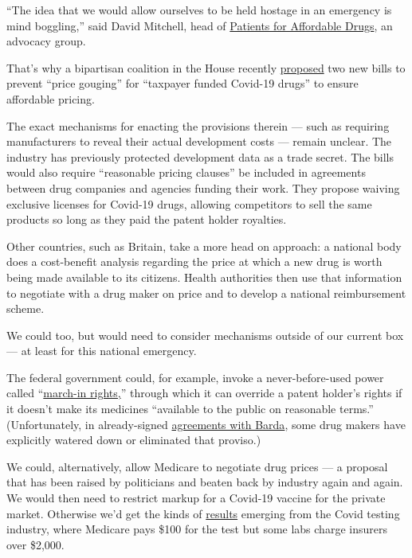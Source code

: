 ``The idea that we would allow ourselves to be held hostage in an
emergency is mind boggling,'' said David Mitchell, head of
\href{https://www.patientsforaffordabledrugsnow.org/press-releases-and-news-content/2020/6/22/patients-for-affordable-drugs-now-endorses-bipartisan-legislation-to-ensure-reasonable-prices-for-taxpayer-funded-covid-19-drugs}{Patients
for Affordable Drugs}, an advocacy group.

That's why a bipartisan coalition in the House recently
\href{https://www.healthleadersmedia.com/welcome-ad?toURL=/finance/bipartisan-bills-aim-prevent-price-gouging-taxpayer-funded-covid-19-drugs}{proposed}
two new bills to prevent ``price gouging'' for ``taxpayer funded
Covid-19 drugs'' to ensure affordable pricing.

The exact mechanisms for enacting the provisions therein --- such as
requiring manufacturers to reveal their actual development costs ---
remain unclear. The industry has previously protected development data
as a trade secret. The bills would also require ``reasonable pricing
clauses'' be included in agreements between drug companies and agencies
funding their work. They propose waiving exclusive licenses for Covid-19
drugs, allowing competitors to sell the same products so long as they
paid the patent holder royalties.

Other countries, such as Britain, take a more head on approach: a
national body does a cost-benefit analysis regarding the price at which
a new drug is worth being made available to its citizens. Health
authorities then use that information to negotiate with a drug maker on
price and to develop a national reimbursement scheme.

We could too, but would need to consider mechanisms outside of our
current box --- at least for this national emergency.

The federal government could, for example, invoke a never-before-used
power called
``\href{https://www.nytimes3xbfgragh.onion/2019/07/06/opinion/drug-pricing-trump.html}{march-in
rights,}'' through which it can override a patent holder's rights if it
doesn't make its medicines ``available to the public on reasonable
terms.'' (Unfortunately, in already-signed
\href{https://www.axios.com/federal-government-barda-contracts-moderna-regeneron-aaf9fde2-2ee1-46fb-8465-0d573e6af1ed.html}{agreements
with Barda}, some drug makers have explicitly watered down or eliminated
that proviso.)

We could, alternatively, allow Medicare to negotiate drug prices --- a
proposal that has been raised by politicians and beaten back by industry
again and again. We would then need to restrict markup for a Covid-19
vaccine for the private market. Otherwise we'd get the kinds of
\href{https://www.nytimes3xbfgragh.onion/2020/06/16/upshot/coronavirus-test-cost-varies-widely.html}{results}
emerging from the Covid testing industry, where Medicare pays \$100 for
the test but some labs charge insurers over \$2,000.

